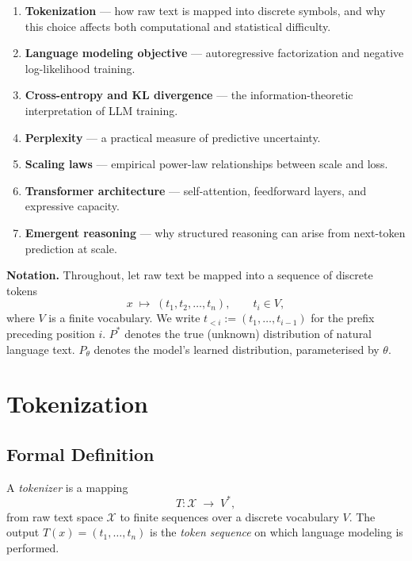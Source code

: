 \documentclass[11pt,a4paper]{article}
\theoremstyle{definition}
\theoremstyle{plain}
\begin{document}
\begin{enumerate}[leftmargin=2em, itemsep=2pt]
  \item \textbf{Tokenization} --- how raw text is mapped into discrete symbols,
        and why this choice affects both computational and statistical difficulty.
  \item \textbf{Language modeling objective} --- autoregressive factorization
        and negative log-likelihood training.
  \item \textbf{Cross-entropy and KL divergence} --- the information-theoretic
        interpretation of LLM training.
  \item \textbf{Perplexity} --- a practical measure of predictive uncertainty.
  \item \textbf{Scaling laws} --- empirical power-law relationships between
        scale and loss.
  \item \textbf{Transformer architecture} --- self-attention, feedforward layers,
        and expressive capacity.
  \item \textbf{Emergent reasoning} --- why structured reasoning can arise
        from next-token prediction at scale.
\end{enumerate}

\medskip
\noindent
\textbf{Notation.}\enspace
Throughout, let raw text be mapped into a sequence of discrete tokens
\[
  x \;\mapsto\; (t_1, t_2, \dots, t_n), \qquad t_i \in V,
\]
where $V$ is a finite vocabulary.
We write $t_{<i} := (t_1, \dots, t_{i-1})$ for the prefix preceding position $i$.
$P^*$ denotes the true (unknown) distribution of natural language text.
$P_\theta$ denotes the model's learned distribution, parameterised by $\theta$.

\section{Tokenization}

\subsection{Formal Definition}

\begin{defbox}
A \textit{tokenizer} is a mapping
\[
  T : \mathcal{X} \;\longrightarrow\; V^{*},
\]
from raw text space $\mathcal{X}$ to finite sequences over a discrete vocabulary $V$.
The output $T(x) = (t_1, \dots, t_n)$ is the \emph{token sequence} on which
language modeling is performed.
\end{defbox}
\end{document}
